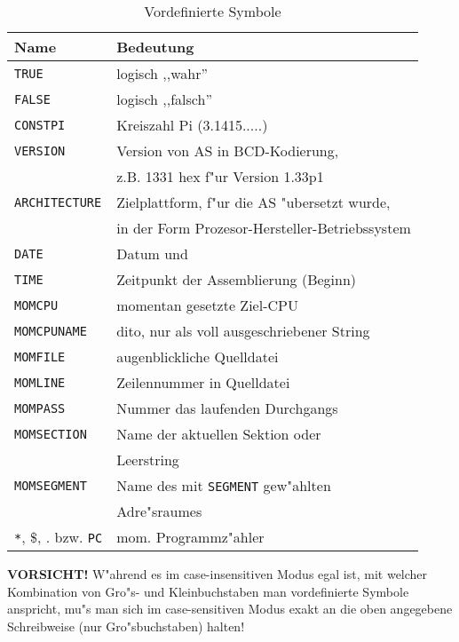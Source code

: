 \documentclass[12pt,a4paper,twoside]{report}
\newcommand{\bb}[1]{{\bf #1}}
\newcommand{\tty}[1]{{\tt #1}}
\begin{document}
\begin{table*}[p]
\begin{center}\begin{tabular}{|l|l|}
\hline
Name             & Bedeutung \\
\hline
\hline
\tty{TRUE}             & logisch ,,wahr'' \\
\tty{FALSE}            & logisch ,,falsch'' \\
\tty{CONSTPI}          & Kreiszahl Pi (3.1415.....) \\
\tty{VERSION}          & Version von AS in BCD-Kodierung, \\
                       & z.B. 1331 hex f"ur Version 1.33p1 \\
\tty{ARCHITECTURE}     & Zielplattform, f"ur die AS "ubersetzt wurde, \\
                       & in der Form Prozesor-Hersteller-Betriebssystem \\
\tty{DATE}             & Datum und \\
\tty{TIME}             & Zeitpunkt der Assemblierung (Beginn) \\
\tty{MOMCPU}           & momentan gesetzte Ziel-CPU \\
\tty{MOMCPUNAME}       & dito, nur als voll ausgeschriebener String \\
\tty{MOMFILE}          & augenblickliche Quelldatei \\
\tty{MOMLINE}          & Zeilennummer in Quelldatei \\
\tty{MOMPASS}          & Nummer das laufenden Durchgangs \\
\tty{MOMSECTION}       & Name der aktuellen Sektion oder \\
                       & Leerstring \\
\tty{MOMSEGMENT}       & Name des mit \tty{SEGMENT} gew"ahlten \\
                       & Adre"sraumes \\
\verb!*!, \$, . bzw. \tty{PC} & mom. Programmz"ahler \\
\hline
\end{tabular}\end{center}
\caption{Vordefinierte Symbole\label{TabPredefined}}
\end{table*}
\bb{VORSICHT!}  W"ahrend es im case-insensitiven Modus egal ist,
mit welcher Kombination von Gro"s- und Kleinbuchstaben man
vordefinierte Symbole anspricht, mu"s man sich im case-sensitiven
Modus exakt an die oben angegebene Schreibweise (nur Gro"sbuchstaben)
halten!
\par
\end{document}

